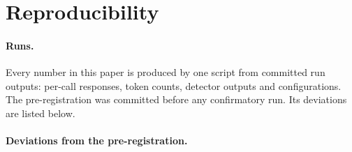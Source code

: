 \section{Reproducibility}
\label{app:repro}
\paragraph{Runs.} Every number in this paper is produced by one script from committed run outputs: per-call responses,
token counts, detector outputs and configurations. The pre-registration was committed before any confirmatory run.
Its deviations are listed below.

\paragraph{Deviations from the pre-registration.}
